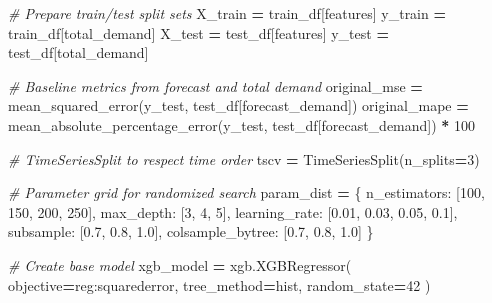 \documentclass[mstat,12pt]{unswthesis}
\newenvironment{Shaded}{\begin{snugshade}}{\end{snugshade}}
\newcommand{\CommentTok}[1]{\textcolor[rgb]{0.56,0.35,0.01}{\textit{#1}}}
\newcommand{\DecValTok}[1]{\textcolor[rgb]{0.00,0.00,0.81}{#1}}
\newcommand{\FloatTok}[1]{\textcolor[rgb]{0.00,0.00,0.81}{#1}}
\newcommand{\NormalTok}[1]{#1}
\newcommand{\OperatorTok}[1]{\textcolor[rgb]{0.81,0.36,0.00}{\textbf{#1}}}
\newcommand{\StringTok}[1]{\textcolor[rgb]{0.31,0.60,0.02}{#1}}
\begin{document}
\begin{Shaded}
\begin{Highlighting}[]
\CommentTok{\# Prepare train/test split sets}
\NormalTok{X\_train }\OperatorTok{=}\NormalTok{ train\_df[features]}
\NormalTok{y\_train }\OperatorTok{=}\NormalTok{ train\_df[}\StringTok{\textquotesingle{}total\_demand\textquotesingle{}}\NormalTok{]}
\NormalTok{X\_test }\OperatorTok{=}\NormalTok{ test\_df[features]}
\NormalTok{y\_test }\OperatorTok{=}\NormalTok{ test\_df[}\StringTok{\textquotesingle{}total\_demand\textquotesingle{}}\NormalTok{]}

\CommentTok{\# Baseline metrics from forecast and total demand}
\NormalTok{original\_mse }\OperatorTok{=}\NormalTok{ mean\_squared\_error(y\_test, }
\NormalTok{    test\_df[}\StringTok{\textquotesingle{}forecast\_demand\textquotesingle{}}\NormalTok{])}
\NormalTok{original\_mape }\OperatorTok{=}\NormalTok{ mean\_absolute\_percentage\_error(y\_test, }
\NormalTok{    test\_df[}\StringTok{\textquotesingle{}forecast\_demand\textquotesingle{}}\NormalTok{]) }\OperatorTok{*} \DecValTok{100}

\CommentTok{\# TimeSeriesSplit to respect time order}
\NormalTok{tscv }\OperatorTok{=}\NormalTok{ TimeSeriesSplit(n\_splits}\OperatorTok{=}\DecValTok{3}\NormalTok{)}

\CommentTok{\# Parameter grid for randomized search}
\NormalTok{param\_dist }\OperatorTok{=}\NormalTok{ \{}
    \StringTok{\textquotesingle{}n\_estimators\textquotesingle{}}\NormalTok{: [}\DecValTok{100}\NormalTok{, }\DecValTok{150}\NormalTok{, }\DecValTok{200}\NormalTok{, }\DecValTok{250}\NormalTok{],}
    \StringTok{\textquotesingle{}max\_depth\textquotesingle{}}\NormalTok{: [}\DecValTok{3}\NormalTok{, }\DecValTok{4}\NormalTok{, }\DecValTok{5}\NormalTok{],}
    \StringTok{\textquotesingle{}learning\_rate\textquotesingle{}}\NormalTok{: [}\FloatTok{0.01}\NormalTok{, }\FloatTok{0.03}\NormalTok{, }\FloatTok{0.05}\NormalTok{, }\FloatTok{0.1}\NormalTok{],}
    \StringTok{\textquotesingle{}subsample\textquotesingle{}}\NormalTok{: [}\FloatTok{0.7}\NormalTok{, }\FloatTok{0.8}\NormalTok{, }\FloatTok{1.0}\NormalTok{],}
    \StringTok{\textquotesingle{}colsample\_bytree\textquotesingle{}}\NormalTok{: [}\FloatTok{0.7}\NormalTok{, }\FloatTok{0.8}\NormalTok{, }\FloatTok{1.0}\NormalTok{]}
\NormalTok{\}}

\CommentTok{\# Create base model}
\NormalTok{xgb\_model }\OperatorTok{=}\NormalTok{ xgb.XGBRegressor(}
\NormalTok{    objective}\OperatorTok{=}\StringTok{\textquotesingle{}reg:squarederror\textquotesingle{}}\NormalTok{,}
\NormalTok{    tree\_method}\OperatorTok{=}\StringTok{\textquotesingle{}hist\textquotesingle{}}\NormalTok{,}
\NormalTok{    random\_state}\OperatorTok{=}\DecValTok{42}
\NormalTok{)}


\end{Highlighting}
\end{Shaded}
\end{document}
